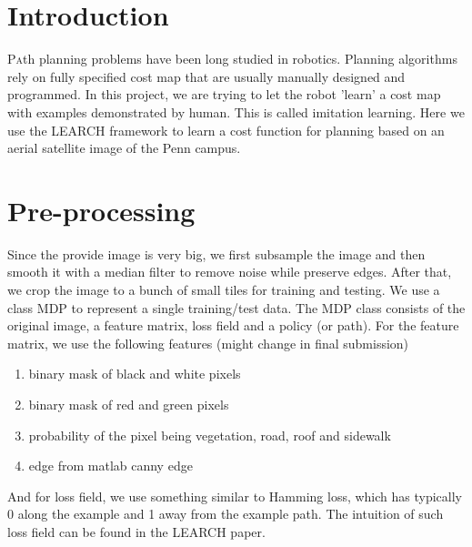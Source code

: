 \documentclass[twoside]{article}
\begin{document}
\begin{multicols}{2} %

\section{Introduction}
\lettrine[nindent=0em,lines=2]{P}ath planning problems have been long studied in robotics. Planning algorithms rely on fully specified cost map that are usually manually designed and programmed. In this project, we are trying to let the robot 'learn' a cost map with examples demonstrated by human. This is called imitation learning. Here we use the LEARCH framework to learn a cost function for planning based on an aerial satellite image of the Penn campus.


\section{Pre-processing}
Since the provide image is very big, we first subsample the image and then smooth it with a median filter to remove noise while preserve edges. After that, we crop the image to a bunch of small tiles for training and testing. We use a class MDP to represent a single training/test data. The MDP class consists of the original image, a feature matrix, loss field and a policy (or path). 
For the feature matrix, we use the following features (might change in final submission)
\begin{enumerate}
\item binary mask of black and white pixels
\item binary mask of red and green pixels
\item probability of the pixel being vegetation, road, roof and sidewalk
\item edge from matlab canny edge
\end{enumerate}
And for loss field, we use something similar to Hamming loss, which has typically 0 along the example and 1 away from the example path. The intuition of such loss field can be found in the LEARCH paper.


\end{multicols}
\end{document}
